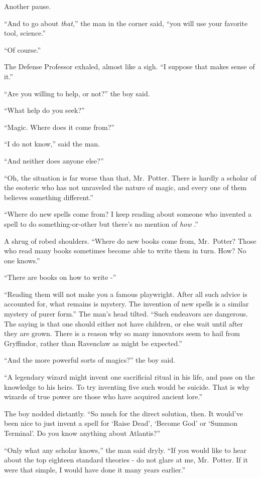 Another pause.

``And to go about \emph{that,}'' the man in the corner said, ``you will
use your favorite tool, science.''

``Of course.''

The Defense Professor exhaled, almost like a sigh. ``I suppose that
makes sense of it.''

``Are you willing to help, or not?'' the boy said.

``What help do you seek?''

``Magic. Where does it come from?''

``I do not know,'' said the man.

``And neither does anyone else?''

``Oh, the situation is far worse than that, Mr.~Potter. There is hardly
a scholar of the esoteric who has not unraveled the nature of magic, and
every one of them believes something different.''

``Where do new spells come from? I keep reading about someone who
invented a spell to do something-or-other but there's no mention of
\emph{how} .''

A shrug of robed shoulders. ``Where do new books come from, Mr.~Potter?
Those who read many books sometimes become able to write them in turn.
How? No one knows.''

``There are books on how to write -''

``Reading them will not make you a famous playwright. After all such
advice is accounted for, what remains is mystery. The invention of new
spells is a similar mystery of purer form.'' The man's head tilted.
``Such endeavors are dangerous. The saying is that one should either not
have children, or else wait until after they are grown. There is a
reason why so many innovators seem to hail from Gryffindor, rather than
Ravenclaw as might be expected.''

``And the more powerful sorts of magics?'' the boy said.

``A legendary wizard might invent one sacrificial ritual in his life,
and pass on the knowledge to his heirs. To try inventing five such would
be suicide. That is why wizards of true power are those who have
acquired ancient lore.''

The boy nodded distantly. ``So much for the direct solution, then. It
would've been nice to just invent a spell for `Raise Dead', `Become God'
or `Summon Terminal'. Do you know anything about Atlantis?''

``Only what any scholar knows,'' the man said dryly. ``If you would like
to hear about the top eighteen standard theories - do not glare at me,
Mr.~Potter. If it were that simple, I would have done it many years
earlier.''


